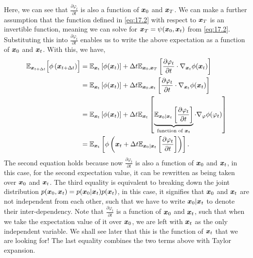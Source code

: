 Here, we can see that $\frac{\partial \varphi_t}{\partial t}$ is also a function of $\bm{x}_0$ and $\bm{x}_T$. We can make a further assumption that the function defined in \cref{eq:17.2} with respect to $\bm{x}_T$ is an invertible function, meaning we can solve for $\bm{x}_T=\psi(\bm{x}_0,\bm{x}_{t})$ from \cref{eq:17.2}. Substituting this into $\frac{\partial \varphi_t}{\partial t}$ enables us to write the above expectation as a function of $\bm{x}_0$ and $\bm{x}_{t}$. With this, we have,
\begin{align}
    \mathbb{E}_{\bm{x}_{t+\Delta t}}\Bigl[ \phi\left(\bm{x}_{t+\Delta t} \right)\Bigr] &=\mathbb{E}_{\bm{x}_{t}} \left[ \phi(\bm{x}_{t})\right] + \Delta t \mathbb{E}_{\bm{x}_0,\bm{x}_T} \left[ \frac{\partial \varphi_t}{\partial t}\cdot\nabla_{\bm{x}_{t}}\phi(\bm{x}_{t})  \right] \nonumber\\
    &=\mathbb{E}_{\bm{x}_{t}} \left[ \phi(\bm{x}_{t})\right] + \Delta t \mathbb{E}_{\bm{x}_0,\bm{x}_{t}} \left[ \frac{\partial \varphi_t}{\partial t}\cdot\nabla_{\bm{x}_{t}}\phi(\bm{x}_{t})  \right] \label{eq:17.14}\\
    &=\mathbb{E}_{\bm{x}_{t}} \left[ \phi(\bm{x}_{t})\right] + \Delta t 
  \mathbb{E}_{\bm{x}_{t}}\left[  \underbrace{\mathbb{E}_{\bm{x}_0|\bm{x}_{t}} \left[\frac{\partial \varphi_t}{\partial t}\right] }_{\mbox{\scriptsize{function of $\bm{x}_{t}$}}} \cdot\nabla_{\varphi}\phi(\varphi_t) \right] \nonumber \\
  &= \mathbb{E}_{\bm{x}_{t}}\left[ \phi\left(\bm{x}_{t}+\Delta t  \mathbb{E}_{\bm{x}_0|\bm{x}_{t}} \left[\frac{\partial \varphi_t}{\partial t}\right] \right)\right].\nonumber
\end{align}
The second equation holds because now $\frac{\partial \varphi_t}{\partial t}$ is also a function of $\bm{x}_0$ and $\bm{x}_{t}$, in this case, for the second expectation value, it can be rewritten as being taken over $\bm{x}_0$ and $\bm{x}_{t}$. The third equality is equivalent to breaking down the joint distribution $p(\bm{x}_0,\bm{x}_{t})=p(\bm{x}_0|\bm{x}_t)p(\bm{x}_{t})$, in this case, it signifies that $\bm{x}_0$ and $\bm{x}_{t}$ are not independent from each other, such that we have to write $\bm{x}_0|\bm{x}_{t}$ to denote their inter-dependency. Note that   $\frac{\partial \varphi_t}{\partial t}$ is  a function of $\bm{x}_0$ and $\bm{x}_{t}$, such that when we take the expectation value of it over $\bm{x}_0$, we are left with $\bm{x}_{t}$ as the only independent variable. We shall see later that this is the function of $\bm{x}_{t}$ that we are looking for! The last equality combines the two terms above with Taylor expansion. 


